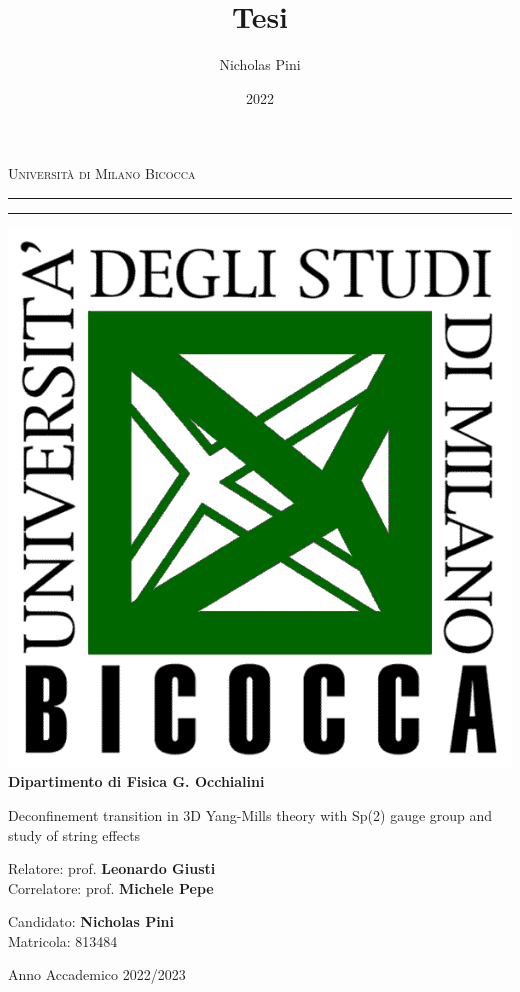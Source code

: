 \documentclass[reqno,12pt]{article}
\title{Tesi}
\date{2022}
\author{Nicholas Pini}
\numberwithin{equation}{section}
\begin{document}
\begin{titlepage}
	\begin{center}
		{{\Large{\textsc{Università di  Milano Bicocca}}}} \rule[0.1cm]{14cm}{0.1mm}
		\rule[0.5cm]{14cm}{0.6mm}
		\includegraphics[scale=0.45]{logo.png}\\
		{\small{\bf Dipartimento di Fisica G. Occhialini}}
					
	\end{center}
	\vspace{10mm}
	\begin{center}
			{\LARGE{Deconfinement transition in 3D Yang-Mills theory with Sp(2) gauge group and study of string effects}}\\
			\vspace{13mm}{\large Tesi magistrale}
	\end{center}
	\vspace{15mm}
	\par
	\noindent
	\begin{minipage}[t]{0.60\textwidth}
	{
		Relatore: prof. {\bf Leonardo Giusti}\\
		Correlatore: prof. {\bf Michele Pepe}\\
	}
	\end{minipage}
	\hfill
	\begin{minipage}[t]{0.40\textwidth}\raggedleft
			{Candidato: {\bf Nicholas Pini}\\
			Matricola: 813484}
	\end{minipage}
	\begin{center}
	{Anno Accademico 2022/2023}
	\end{center}
\end{titlepage}
\end{document}
